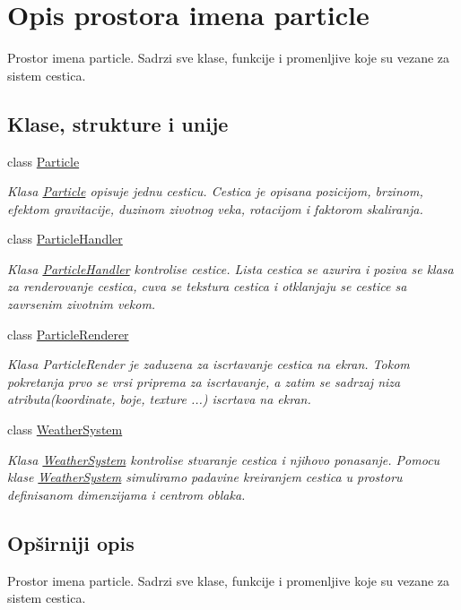 \hypertarget{namespaceparticle}{}\section{Opis prostora imena particle}
\label{namespaceparticle}


Prostor imena particle. Sadrzi sve klase, funkcije i promenljive koje su vezane za sistem cestica.  


\subsection*{Klase, strukture i unije}
\begin{DoxyCompactItemize}
\item 
class \hyperlink{classparticle_1_1Particle}{Particle}
\begin{DoxyCompactList}\small\item\em Klasa \hyperlink{classparticle_1_1Particle}{Particle} opisuje jednu cesticu. Cestica je opisana pozicijom, brzinom, efektom gravitacije, duzinom zivotnog veka, rotacijom i faktorom skaliranja. \end{DoxyCompactList}\item 
class \hyperlink{classparticle_1_1ParticleHandler}{Particle\+Handler}
\begin{DoxyCompactList}\small\item\em Klasa \hyperlink{classparticle_1_1ParticleHandler}{Particle\+Handler} kontrolise cestice. Lista cestica se azurira i poziva se klasa za renderovanje cestica, cuva se tekstura cestica i otklanjaju se cestice sa zavrsenim zivotnim vekom. \end{DoxyCompactList}\item 
class \hyperlink{classparticle_1_1ParticleRenderer}{Particle\+Renderer}
\begin{DoxyCompactList}\small\item\em Klasa Particle\+Render je zaduzena za iscrtavanje cestica na ekran. Tokom pokretanja prvo se vrsi priprema za iscrtavanje, a zatim se sadrzaj niza atributa(koordinate, boje, texture ...) iscrtava na ekran. \end{DoxyCompactList}\item 
class \hyperlink{classparticle_1_1WeatherSystem}{Weather\+System}
\begin{DoxyCompactList}\small\item\em Klasa \hyperlink{classparticle_1_1WeatherSystem}{Weather\+System} kontrolise stvaranje cestica i njihovo ponasanje. Pomocu klase \hyperlink{classparticle_1_1WeatherSystem}{Weather\+System} simuliramo padavine kreiranjem cestica u prostoru definisanom dimenzijama i centrom oblaka. \end{DoxyCompactList}\end{DoxyCompactItemize}


\subsection{Opširniji opis}
Prostor imena particle. Sadrzi sve klase, funkcije i promenljive koje su vezane za sistem cestica. 